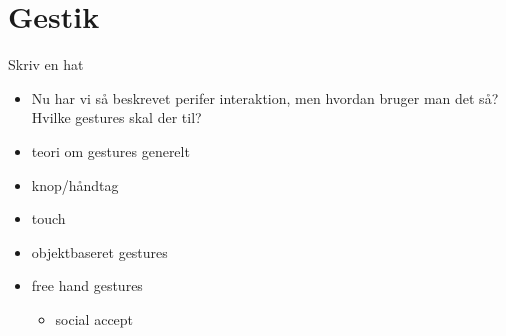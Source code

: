 \section{Gestik}
\label{Gestik}
%
Skriv en hat

\begin{itemize}
	\item Nu har vi så beskrevet perifer interaktion, men hvordan bruger man det så? Hvilke gestures skal der til?
	\item teori om gestures generelt
	\item knop/håndtag
	\item touch
	\item objektbaseret gestures
	\item free hand gestures
	\begin{itemize}
		\item social accept
	\end{itemize}
\end{itemize}\blankline
%
